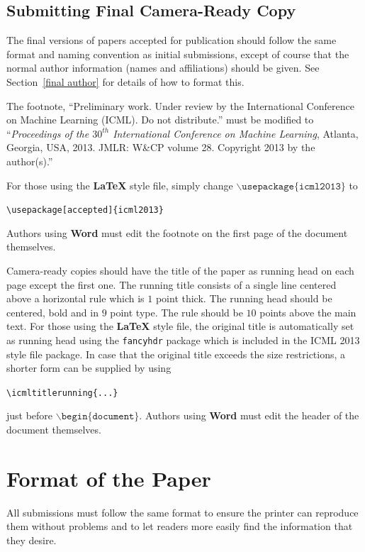 \documentclass{article}
\begin{document}
\subsection{Submitting Final Camera-Ready Copy}

The final versions of papers accepted for publication should follow the
same format and naming convention as initial submissions, except of
course that the normal author information (names and affiliations)
should be given.  See Section~\ref{final author} for details of how to
format this.

The footnote, ``Preliminary work.  Under review by the International
Conference on Machine Learning (ICML).  Do not distribute.'' must be
modified to ``\textit{Proceedings of the
$\mathit{30}^{th}$ International Conference on Machine Learning},
Atlanta, Georgia, USA, 2013.  JMLR: W\&CP volume 28. 
Copyright 2013 by the author(s).''

For those using the \textbf{\LaTeX} style file, simply change
$\mathtt{\backslash usepackage\{icml2013\}}$ to 

\verb|\usepackage[accepted]{icml2013}|

\noindent
Authors using \textbf{Word} must edit the
footnote on the first page of the document themselves.

Camera-ready copies should have the title of the paper as running head
on each page except the first one.  The running title consists of a
single line centered above a horizontal rule which is $1$ point thick.
The running head should be centered, bold and in $9$ point type.  The
rule should be $10$ points above the main text.  For those using the
\textbf{\LaTeX} style file, the original title is automatically set as running
head using the {\tt fancyhdr} package which is included in the ICML
2013 style file package.  In case that the original title exceeds the
size restrictions, a shorter form can be supplied by using

\verb|\icmltitlerunning{...}|

just before $\mathtt{\backslash begin\{document\}}$.
Authors using \textbf{Word} must edit the header of the document themselves.

\section{Format of the Paper} 
 
All submissions must follow the same format to ensure the printer can
reproduce them without problems and to let readers more easily find
the information that they desire.
\end{document}
